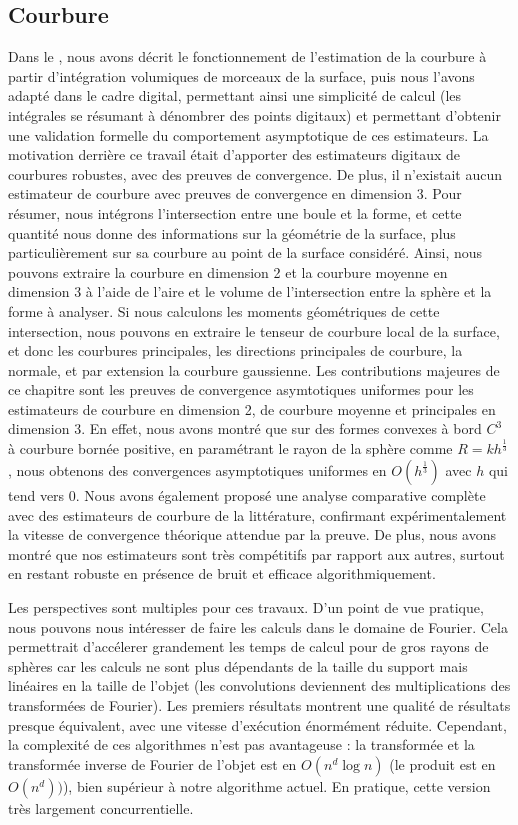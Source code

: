 \subsection*{Courbure}
%
Dans le , nous avons décrit le fonctionnement de
l'estimation de la courbure à partir d'intégration volumiques de morceaux de la
surface, puis nous l'avons adapté dans le cadre digital, permettant ainsi une
simplicité de calcul (les intégrales se résumant à dénombrer des points
digitaux) et permettant d'obtenir une validation formelle du comportement
asymptotique de ces estimateurs. La motivation derrière ce travail était
d'apporter des estimateurs digitaux de courbures robustes, avec des preuves de
convergence. De plus, il n'existait aucun estimateur de courbure avec preuves de
convergence en dimension 3.
%
Pour résumer, nous intégrons l'intersection entre une boule et la forme, et
cette quantité nous donne des informations sur la géométrie de la surface, plus
particulièrement sur sa courbure au point de la surface considéré. Ainsi, nous
pouvons extraire la courbure en dimension 2 et la courbure moyenne en dimension
3 à l'aide de \respp l'aire et le volume de l'intersection entre la sphère et la
forme à analyser. Si nous calculons les moments géométriques de cette
intersection, nous pouvons en extraire le tenseur de courbure local de la
surface, et donc les courbures principales, les directions principales de
courbure, la normale, et par extension la courbure gaussienne.
%
Les contributions majeures de ce chapitre sont les preuves de convergence
asymtotiques uniformes pour les estimateurs de courbure en dimension 2, de
courbure moyenne et principales en dimension 3. En effet, nous avons montré que
sur des formes convexes à bord $C^3$ à courbure bornée positive, en
paramétrant le rayon de la sphère comme $R = kh^\frac{1}{3}$, nous obtenons des
convergences asymptotiques uniformes en $O(h^\frac{1}{3})$ avec $h$ qui tend
vers $0$.
%
Nous avons également proposé une analyse comparative complète avec des
estimateurs de courbure de la littérature, confirmant expérimentalement la
vitesse de convergence théorique attendue par la preuve. De plus, nous avons
montré que nos estimateurs sont très compétitifs par rapport aux autres, surtout
en restant robuste en présence de bruit et efficace algorithmiquement.


Les perspectives sont multiples pour ces travaux. D'un point de vue pratique,
nous pouvons nous intéresser de faire les calculs dans le domaine de Fourier.
Cela permettrait d'accélerer grandement les temps de calcul pour de gros rayons
de sphères car les calculs ne sont plus dépendants de la taille du support mais
linéaires en la taille de l'objet (les convolutions deviennent des
multiplications des transformées de Fourier). Les premiers résultats montrent
une qualité de résultats presque équivalent, avec une vitesse d'exécution
énormément réduite. Cependant, la complexité de ces algorithmes n'est pas
avantageuse : la transformée et la transformée inverse de Fourier de l'objet est
en $O(n^d \log n)$ (le produit est en $O(n^d))$), bien supérieur à notre
algorithme actuel. En pratique, cette version très largement concurrentielle.


